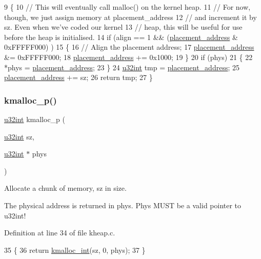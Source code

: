 \begin{DoxyCode}
9 \{
10     \textcolor{comment}{// This will eventually call malloc() on the kernel heap.}
11     \textcolor{comment}{// For now, though, we just assign memory at placement\_address}
12     \textcolor{comment}{// and increment it by sz. Even when we've coded our kernel}
13     \textcolor{comment}{// heap, this will be useful for use before the heap is initialised.}
14     \textcolor{keywordflow}{if} (align == 1 && (\hyperlink{a00062_a9df9c77e08423957a655e27605284987_a9df9c77e08423957a655e27605284987}{placement\_address} & 0xFFFFF000) )
15     \{
16         \textcolor{comment}{// Align the placement address;}
17         \hyperlink{a00062_a9df9c77e08423957a655e27605284987_a9df9c77e08423957a655e27605284987}{placement\_address} &= 0xFFFFF000;
18         \hyperlink{a00062_a9df9c77e08423957a655e27605284987_a9df9c77e08423957a655e27605284987}{placement\_address} += 0x1000;
19     \}
20     \textcolor{keywordflow}{if} (phys)
21     \{
22         *phys = \hyperlink{a00062_a9df9c77e08423957a655e27605284987_a9df9c77e08423957a655e27605284987}{placement\_address};
23     \}
24     \hyperlink{a00116_a7ae3a26c17ddfe117c6291739780801d_a7ae3a26c17ddfe117c6291739780801d}{u32int} tmp = \hyperlink{a00062_a9df9c77e08423957a655e27605284987_a9df9c77e08423957a655e27605284987}{placement\_address};
25     \hyperlink{a00062_a9df9c77e08423957a655e27605284987_a9df9c77e08423957a655e27605284987}{placement\_address} += sz;
26     \textcolor{keywordflow}{return} tmp;
27 \}
\end{DoxyCode}
\mbox{\label{a00065_ac688411503d5934c65d6c5c1ef204d81_ac688411503d5934c65d6c5c1ef204d81}} 
\subsubsection{\texorpdfstring{kmalloc\+\_\+p()}{kmalloc\_p()}}
{\footnotesize\ttfamily \hyperlink{a00116_a7ae3a26c17ddfe117c6291739780801d_a7ae3a26c17ddfe117c6291739780801d}{u32int} kmalloc\+\_\+p (\begin{DoxyParamCaption}\item[{\hyperlink{a00116_a7ae3a26c17ddfe117c6291739780801d_a7ae3a26c17ddfe117c6291739780801d}{u32int}}]{sz,  }\item[{\hyperlink{a00116_a7ae3a26c17ddfe117c6291739780801d_a7ae3a26c17ddfe117c6291739780801d}{u32int} $\ast$}]{phys }\end{DoxyParamCaption})}



Allocate a chunk of memory, sz in size. 

The physical address is returned in phys. Phys M\+U\+ST be a valid pointer to u32int! 

Definition at line 34 of file kheap.\+c.


\begin{DoxyCode}
35 \{
36     \textcolor{keywordflow}{return} \hyperlink{a00062_a8b976e8a7e805ef85fcfa68b9b9bbd63_a8b976e8a7e805ef85fcfa68b9b9bbd63}{kmalloc\_int}(sz, 0, phys);
37 \}
\end{DoxyCode}
